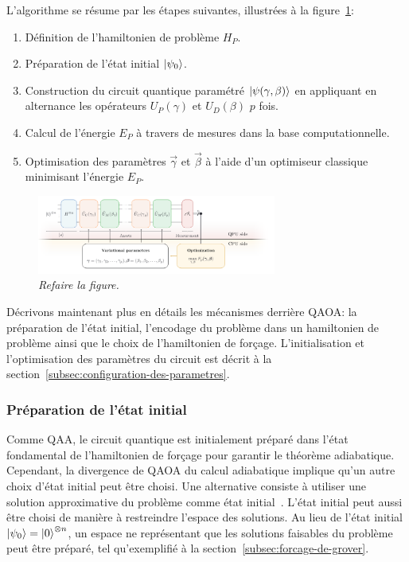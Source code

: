 L'algorithme se résume par les étapes suivantes, illustrées à la figure~\ref{fig:qaoa}:

\begin{enumerate}[(1)]
    \item Définition de l'hamiltonien de problème $H_{P}$.
    \item Préparation de l'état initial $\ket{\psi_{0}}$.
    \item Construction du circuit quantique paramétré $\ket{\psi(\gamma, \beta)}$ en appliquant en alternance les opérateurs $U_{P}(\gamma)$ et $U_{D}(\beta)$ $p$ fois.
    \item Calcul de l'énergie $E_{P}$ à travers de mesures dans la base computationnelle.
    \item Optimisation des paramètres $\vec{\gamma}$ et $\vec{\beta}$ à l'aide d'un optimiseur classique minimisant l'énergie $E_{P}$.
\end{enumerate}

\begin{figure}[ht!]
    \centering
    \includegraphics[width=0.7\textwidth]{figures/qaoa.png}
    \caption[Algorithme quantique d'optimisation approximative]{\textcolor{mydarkred}{\textit{Refaire la figure.}}}
    \label{fig:qaoa}
\end{figure}

Décrivons maintenant plus en détails les mécanismes derrière QAOA: la préparation de l'état initial, l'encodage du problème dans un hamiltonien de problème ainsi que le choix de l'hamiltonien de forçage. L'initialisation et l'optimisation des paramètres du circuit est décrit à la section~\ref{subsec:configuration-des-parametres}.


\subsubsection{Préparation de l'état initial}
\label{subsec:preparation-de-etat-initial}

Comme QAA, le circuit quantique est initialement préparé dans l'état fondamental de l'hamiltonien de forçage pour garantir le théorème adiabatique. Cependant, la divergence de QAOA du calcul adiabatique implique qu'un autre choix d'état initial peut être choisi. Une alternative consiste à utiliser une solution approximative du problème comme état initial~\cite{eggerWarmstartingQuantumOptimization2021}. L'état initial peut aussi être choisi de manière à restreindre l'espace des solutions. Au lieu de l'état initial $\ket{\psi_{0}} = \ket{0}^{\otimes n}$, un espace ne représentant que les solutions faisables du problème peut être préparé, tel qu'exemplifié à la section~\ref{subsec:forcage-de-grover}.

